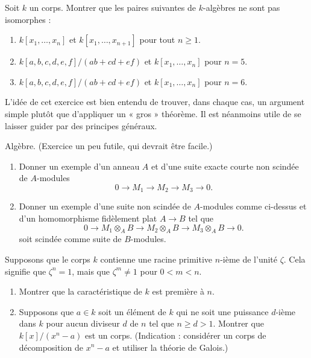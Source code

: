 \begin{exercise}
\label{exercise-not-isomorphic}
Soit $k$ un corps. Montrer que les paires suivantes de
$k$-algèbres ne sont pas isomorphes :
\begin{enumerate}
\item $k[x_1, \ldots, x_n]$ et $k[x_1, \ldots, x_{n + 1}]$ pour tout
$n\geq 1$.
\item $k[a, b, c, d, e, f]/(ab + cd + ef)$ et $k[x_1, \ldots, x_n]$
pour $n = 5$.
\item $k[a, b, c, d, e, f]/(ab + cd + ef)$ et $k[x_1, \ldots, x_n]$
pour $n = 6$.
\end{enumerate}
\end{exercise}

\begin{remark}
\label{remark-simple-geometric}
L'idée de cet exercice est bien entendu de trouver, dans chaque cas,
un argument simple plutôt que d'appliquer un « gros » théorème.
Il est néanmoins utile de se laisser guider par des principes généraux.
\end{remark}

\begin{exercise}
\label{exercise-silly}
Algèbre. (Exercice un peu futile, qui devrait être facile.)
\begin{enumerate}
\item Donner un exemple d'un anneau $A$ et d'une
suite exacte courte non scindée de $A$-modules
$$
0 \to M_1 \to M_2 \to M_3 \to 0.
$$
\item Donner un exemple d'une suite non scindée de $A$-modules
comme ci-dessus et d'un homomorphisme fidèlement plat $A \to B$ tel que
$$
0 \to M_1\otimes_A B \to M_2\otimes_A B \to M_3\otimes_A B \to 0.
$$
soit scindée comme suite de $B$-modules.
\end{enumerate}
\end{exercise}

\begin{exercise}
\label{exercise-field-kummer}
Supposons que le corps $k$ contienne une racine primitive $n$-ième
de l'unité $\zeta$. Cela signifie que $\zeta^n = 1$, mais que $\zeta^m\not = 1$ pour
$0 < m < n$.
\begin{enumerate}
\item Montrer que la caractéristique de $k$ est première à $n$.
\item Supposons que $a \in k$ soit un élément de $k$ qui ne soit une
puissance $d$-ième dans $k$ pour aucun diviseur $d$ de $n$ tel que $n \geq d > 1$. Montrer que
$k[x]/(x^n-a)$ est un corps. (Indication : considérer un corps de décomposition de
$x^n-a$ et utiliser la théorie de Galois.)
\end{enumerate}
\end{exercise}

